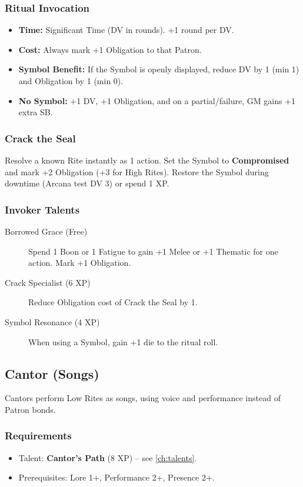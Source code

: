 \subsubsection*{Ritual Invocation}
\label{sec:ritual-invocation}
\begin{itemize}
  \item \textbf{Time:} Significant Time (DV in rounds). +1 round per DV.
  \item \textbf{Cost:} Always mark +1 Obligation to that Patron.
  \item \textbf{Symbol Benefit:} If the Symbol is openly displayed, reduce DV by 1 (min 1) and Obligation by 1 (min 0).
  \item \textbf{No Symbol:} +1 DV, +1 Obligation, and on a partial/failure, GM gains +1 extra SB.
\end{itemize}

\subsubsection*{Crack the Seal}
\label{sec:crack-the-seal}
Resolve a known Rite instantly as 1 action. Set the Symbol to \textbf{Compromised} and mark +2 Obligation (+3 for High Rites). Restore the Symbol during downtime (Arcana test DV 3) or spend 1 XP.

\subsubsection*{Invoker Talents}
\label{sec:invoker-talents}
\begin{description}
  \item[Borrowed Grace (Free)] Spend 1 Boon or 1 Fatigue to gain +1 Melee or +1 Thematic for one action. Mark +1 Obligation.
  \item[Crack Specialist (6 XP)] Reduce Obligation cost of Crack the Seal by 1.
  \item[Symbol Resonance (4 XP)] When using a Symbol, gain +1 die to the ritual roll.
\end{description}

\subsection{Cantor (Songs)}
\label{sec:cantor}

Cantors perform Low Rites as songs, using voice and performance instead of Patron bonds.

\subsubsection*{Requirements}
\begin{itemize}
  \item Talent: \textbf{Cantor’s Path} (8 XP) – see \ref{ch:talents}.
  \item Prerequisites: Lore 1+, Performance 2+, Presence 2+.
\end{itemize}

